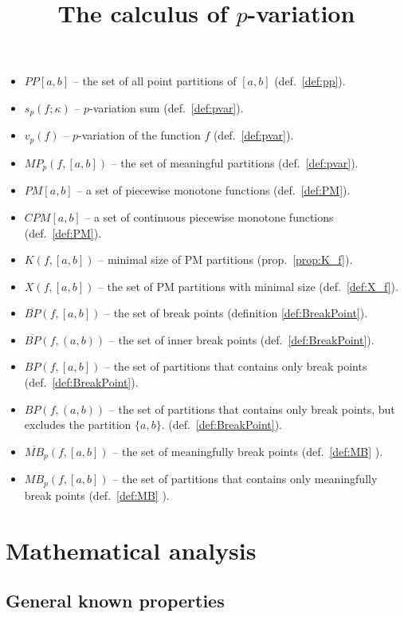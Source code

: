 \documentclass[12pt, a4paper]{article}
\title{The calculus of $p$-variation }
\numberwithin{equation}{section}
\begin{document}
  \maketitle


\begin{itemize}  
  \item $PP[a,b]$ --  the set of all point partitions of $[a,b]$ (def.~\ref{def:pp}).
  \item $s_{p}(f;\kappa)$ --  $p$-variation sum (def.~\ref{def:pvar}).
  \item $v_{p}\left( f\right)$ -- $p$-variation of the function $f$ (def.~\ref{def:pvar}).
  \item $MP_{p}(f,[a,b])$ -- the set of meaningful partitions (def.~\ref{def:pvar}).
  \item $PM[a,b]$ -- a set of piecewise monotone functions (def.~\ref{def:PM}).
  \item $CPM[a,b]$ -- a set of continuous piecewise monotone functions (def.~\ref{def:PM}).
  \item $K(f,[a,b])$ -- minimal size of PM partitions (prop.~\ref{prop:K_f}).
  \item $X(f,[a,b])$ -- the set of PM partitions with minimal size (def.~\ref{def:X_f}).
  \item $\overline{BP}(f,[a,b])$ -- the set of break points (definition \ref{def:BreakPoint}).
  \item $\overline{BP}(f,(a,b))$ -- the set of inner break points (def.~\ref{def:BreakPoint}).
  \item $BP(f,[a,b])$ -- the set of partitions that contains only break points (def.~\ref{def:BreakPoint}). 
  \item $BP(f,(a,b))$ -- the set of partitions that contains only break points, but excludes the partition $\{a,b\}$. (def.~\ref{def:BreakPoint}). 
  \item $\overline{MB}_{p}(f,[a,b])$ -- the set of meaningfully break points (def.~\ref{def:MB} ).
  \item $MB_{p}(f,[a,b])$ -- the set of partitions that contains only meaningfully break points (def.~\ref{def:MB} ).
\end{itemize}   


\section{Mathematical analysis}

\subsection{General known properties}
  
\end{document}
